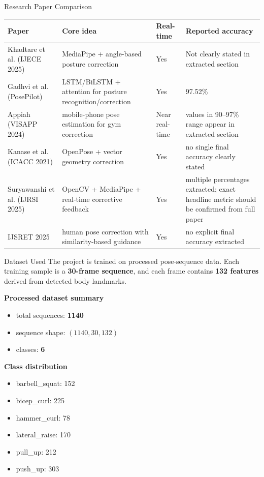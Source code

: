 \documentclass[aspectratio=169]{beamer}
\begin{document}
\begin{frame}{Research Paper Comparison}
\small
\begin{tabular}{p{3.2cm} p{4.5cm} p{2.2cm} p{3.3cm}}
\toprule
\textbf{Paper} & \textbf{Core idea} & \textbf{Real-time} & \textbf{Reported accuracy} \\
\midrule
Khadtare et al. (IJECE 2025) & MediaPipe + angle-based posture correction & Yes & Not clearly stated in extracted section \\
\addlinespace
Gadhvi et al. (PosePilot) & LSTM/BiLSTM + attention for posture recognition/correction & Yes & 97.52\% \\
\addlinespace
Appiah (VISAPP 2024) & mobile-phone pose estimation for gym correction & Near real-time & values in 90--97\% range appear in extracted section \\
\addlinespace
Kanase et al. (ICACC 2021) & OpenPose + vector geometry correction & Yes & no single final accuracy clearly stated \\
\addlinespace
Suryawanshi et al. (IJRSI 2025) & OpenCV + MediaPipe + real-time corrective feedback & Yes & multiple percentages extracted; exact headline metric should be confirmed from full paper \\
\addlinespace
IJSRET 2025 & human pose correction with similarity-based guidance & Yes & no explicit final accuracy extracted \\
\bottomrule
\end{tabular}
\end{frame}

\begin{frame}{Dataset Used}
\small
\justifying
The project is trained on processed pose-sequence data. Each training sample is a \textbf{30-frame sequence}, and each frame contains \textbf{132 features} derived from detected body landmarks.

\vspace{0.2cm}
\textbf{Processed dataset summary}
\begin{itemize}
  \item total sequences: \textbf{1140}
  \item sequence shape: \textbf{\((1140, 30, 132)\)}
  \item classes: \textbf{6}
\end{itemize}

\textbf{Class distribution}
\begin{itemize}
  \item barbell\_squat: 152
  \item bicep\_curl: 225
  \item hammer\_curl: 78
  \item lateral\_raise: 170
  \item pull\_up: 212
  \item push\_up: 303
\end{itemize}
\end{frame}
\end{document}
